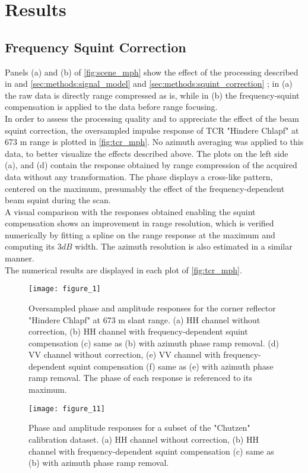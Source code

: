 \section{Results}\label{sec:results}
\subsection{Frequency Squint Correction}\label{sec:results:squint_correction}
Panels (a) and (b) of \autoref{fig:scene_mph} show the effect of the processing described in and \autoref{sec:methods:signal_model} and \autoref{sec:methods:squint_correction} ; in (a) the raw data is directly range compressed as is, while in (b) the frequency-squint compensation is applied to the data before range focusing.\\ 
In order to assess the processing quality and to appreciate the effect of the beam squint correction,  the oversampled impulse response of  TCR "Hindere Chlapf" at 673 m range is plotted in \autoref{fig:tcr_mph}. No azimuth averaging was applied to this data, to better visualize the effects described above. The plots on the left side (a), and (d) contain the response obtained by range compression of the acquired data without any transformation. The phase displays a cross-like pattern, centered on the maximum, presumably the effect of the frequency-dependent beam squint during the scan.\\ A visual comparison with the responses obtained enabling the squint compensation shows an improvement in range resolution, which is verified numerically by fitting a spline on the range response at the maximum and computing its $3 dB$ width. The azimuth resolution is also estimated in a similar manner.\\ The numerical results are displayed in each plot of \autoref{fig:tcr_mph}.
\begin{figure*}[ht]
	\centering
	\texttt{[image: figure\_1]}
	\caption{Oversampled phase and amplitude responses for the corner reflector "Hindere Chlapf" at 673 m slant range. (a) HH channel without correction, (b) HH channel with frequency-dependent squint compensation (c) same as (b) with azimuth phase ramp removal. (d) VV channel without correction, (e) VV channel with frequency-dependent squint compensation (f) same as (e) with azimuth phase ramp removal.
	The phase of each response is referenced to its maximum.}
	\label{fig:tcr_mph}
\end{figure*}

\begin{figure*}[ht]
	\centering
	\texttt{[image: figure\_11]}
	\caption{Phase and amplitude responses for a subset of the "Chutzen" calibration dataset. (a) HH channel without correction, (b) HH channel with frequency-dependent squint compensation (c) same as (b) with azimuth phase ramp removal.}
	\label{fig:scene_mph}
\end{figure*}


